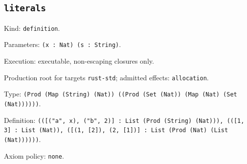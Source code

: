 \documentclass[11pt]{article}
\begin{document}
\subsection*{\texttt{literals}}
\noindent Kind: \texttt{definition}.\par
\noindent Parameters: \texttt{(x : Nat) (s : String)}.\par
\noindent Execution: executable, non-escaping closures only.\par
\noindent Production root for targets \texttt{rust-std}; admitted effects: \texttt{allocation}.\par
\noindent Type: \texttt{(Prod (Map (String) (Nat)) ((Prod (Set (Nat)) (Map (Nat) (Set (Nat))))))}.\par
\noindent Definition: \texttt{(([("a", x), ("b", 2)] : List (Prod (String) (Nat))), (([1, 3] : List (Nat)), ([(1, [2]), (2, [1])] : List (Prod (Nat) (List (Nat))))))}.\par
\noindent Axiom policy: \texttt{none}.\par
\end{document}
